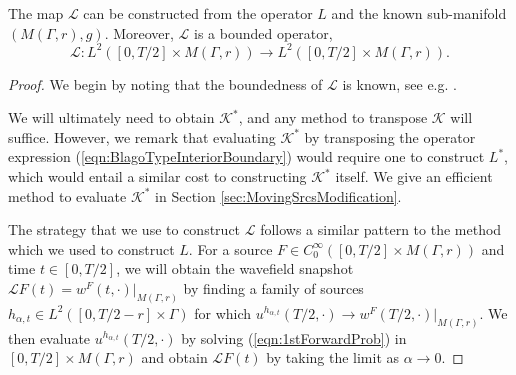 \documentclass[final,leqno]{siamart1116}
\begin{document}
\begin{lemma}
  \label{thm:MovingSrc}
  The map ${\mathcal{L}}$ can be constructed from the operator $L$ and the
  known sub-manifold $(M(\Gamma,r),g)$. Moreover, ${\mathcal{L}}$ is a
  bounded operator,
  \begin{equation}
    {\mathcal{L}} : L^2([0,T/2]\times M(\Gamma,r)) \rightarrow
    L^2([0,T/2]\times M(\Gamma,r)).
  \end{equation}
\end{lemma}
\begin{proof}

  We begin by noting that the boundedness of ${\mathcal{L}}$ is known, see
  e.g.  \cite{Lions1972a}.
  
  
  
  
  
  We will ultimately need to obtain ${\mathcal{K}}^*$, and any method to
  transpose ${\mathcal{K}}$ will suffice. However, we remark that evaluating
  ${\mathcal{K}}^*$ by transposing the operator expression
  (\ref{eqn:BlagoTypeInteriorBoundary}) would require one to construct
  $L^*$, which would entail a similar cost to constructing ${\mathcal{K}}^*$
  itself. We give an efficient method to evaluate ${\mathcal{K}}^*$ in
  Section \ref{sec:MovingSrcsModification}.

The strategy that we use to construct ${\mathcal{L}}$ follows a similar
pattern to the method which we used to construct $L$. For
a source $F \in C_0^\infty([0,T/2]\times M(\Gamma,r))$ and time $t \in
[0,T/2]$, we will obtain the wavefield snapshot ${\mathcal{L}} F(t) =
w^F(t,\cdot)|_{M(\Gamma,r)}$ by finding a family of sources
$h_{\alpha,t} \in L^2([0,T/2-r]\times \Gamma)$ for which
$u^{h_{\alpha,t}}(T/2,\cdot) \rightarrow
w^F(T/2,\cdot)|_{M(\Gamma,r)}$. We then evaluate
$u^{h_{\alpha,t}}(T/2,\cdot)$ by solving (\ref{eqn:1stForwardProb}) in
$[0,T/2]\times M(\Gamma,r)$ and obtain ${\mathcal{L}} F(t)$ by taking the
limit as $\alpha \rightarrow 0$.


\end{proof}
\end{document}
